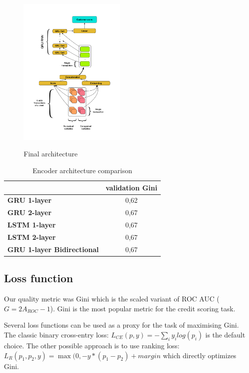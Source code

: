 \documentclass{sigkddExp}
\begin{document}
\begin{figure}
  \caption{Final architecture}
  \includegraphics[width=0.46\textwidth]{architecture.png}
  \label{fig-arch}
\end{figure}

\begin{table}
\caption{Encoder architecture comparison}
\begin{tabular}{ | l | c |  }
\hline
& \textbf{validation Gini} \\
\hline
\textbf{GRU 1-layer} & 0,62  \\
\textbf{GRU 2-layer} & 0,67  \\
\textbf{LSTM 1-layer} & 0,67  \\
\textbf{LSTM 2-layer} & 0,67  \\
\textbf{GRU 1-layer Bidirectional} & 0,67  \\
\hline
\end{tabular}
\label{tab3}
\end{table}



\subsection{Loss function}

Our quality metric was Gini which is the scaled variant of ROC AUC ($G = 2A_{ROC} - 1$). Gini is the most popular metric for the credit scoring task.

Several loss functions can be used as a proxy for the task of maximising Gini. The classic binary cross-entry loss: $L_{CE}(p, y) = - \sum_i y_ilog(p_i)$ is the default choice.
The other possible approach is to use ranking loss: $ L_R(p_1, p_2, y) = \max(0, -y * (p_1 - p_2) + margin $ which directly optimizes Gini.
\end{document}
